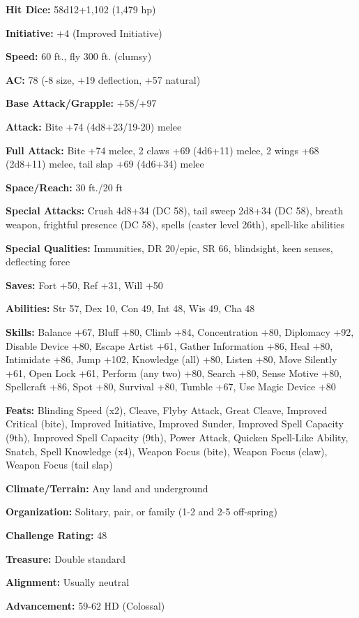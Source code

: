 \documentclass{article}
\begin{document}
\textbf{Hit Dice:} 58d12+1,102 (1,479 hp)

\textbf{Initiative:} +4 (Improved Initiative) 

\textbf{Speed:} 60 ft., fly 300 ft. (clumsy) 

\textbf{AC:} 78 (-8 size, +19 deflection, +57 natural) 

\textbf{Base Attack/Grapple: }+58/+97

\textbf{Attack: } Bite +74 (4d8+23/19-20) melee 

\textbf{Full Attack:}  Bite +74 melee, 2 claws +69 (4d6+11) melee, 2 wings +68 
(2d8+11) melee, tail slap +69 (4d6+34)\textbf{ }melee

\textbf{Space/Reach:} 30 ft./20 ft

\textbf{Special Attacks:} Crush 4d8+34 (DC 58), tail sweep 2d8+34 (DC 58), breath 
weapon, frightful presence (DC 58), spells (caster level 26th), spell-like abilities 

\textbf{Special Qualities:} Immunities, DR 20/epic, SR 66, blindsight, keen senses, 
deflecting force 

\textbf{Saves:} Fort +50, Ref +31, Will +50 

\textbf{Abilities:} Str 57, Dex 10, Con 49, Int 48, Wis 49, Cha 48 

\textbf{Skills:} Balance +67, Bluff +80, Climb +84, Concentration +80, Diplomacy 
+92, Disable Device +80, Escape Artist +61, Gather Information +86, Heal +80, Intimidate 
+86, Jump +102, Knowledge (all) +80, Listen +80, Move Silently +61, Open Lock +61, 
Perform (any two) +80, Search +80, Sense Motive +80, Spellcraft +86, Spot +80, 
Survival +80, Tumble +67, Use Magic Device +80 

\textbf{Feats:} Blinding Speed (x2), Cleave, Flyby Attack, Great Cleave, Improved 
Critical (bite), Improved Initiative, Improved Sunder, Improved Spell Capacity 
(9th), Improved Spell Capacity (9th), Power Attack, Quicken Spell-Like Ability, 
Snatch, Spell Knowledge (x4), Weapon Focus (bite), Weapon Focus (claw), Weapon 
Focus (tail slap) 

\textbf{Climate/Terrain:} Any land and underground 

\textbf{Organization:} Solitary, pair, or family (1-2 and 2-5 off-spring) 

\textbf{Challenge Rating:} 48 

\textbf{Treasure:} Double standard 

\textbf{Alignment:} Usually neutral 

\textbf{Advancement:} 59-62 HD (Colossal) 
\end{document}
